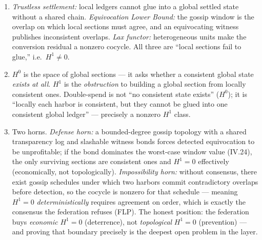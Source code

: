 \begin{enumerate}[label=\textbf{IV.\arabic*},leftmargin=2.8em,itemsep=8pt,topsep=4pt]
\item \wbcheck \emph{Trustless settlement:} local ledgers cannot glue into a global
  settled state without a shared chain. \emph{Equivocation Lower Bound:} the gossip
  window is the overlap on which local sections must agree, and an equivocating
  witness publishes inconsistent overlaps. \emph{Lax functor:} heterogeneous units
  make the conversion residual a nonzero cocycle. All three are ``local sections fail
  to glue,'' i.e.\ $H^1\ne 0$.

\item \wbcheck $H^0$ is the space of global sections --- it asks whether a consistent
  global state \emph{exists at all}. $H^1$ is the \emph{obstruction} to building a
  global section from locally consistent ones. Double-spend is not ``no consistent
  state exists'' ($H^0$); it is ``locally each harbor is consistent, but they cannot
  be glued into one consistent global ledger'' --- precisely a nonzero $H^1$ class.

\item \wbopen\wbstar Two horns. \emph{Defense horn:} a bounded-degree gossip topology
  with a shared transparency log and slashable witness bonds forces detected
  equivocation to be unprofitable; if the bond dominates the worst-case window value
  (IV.24), the only surviving sections are consistent ones and $H^1=0$ effectively
  (economically, not topologically). \emph{Impossibility horn:} without consensus,
  there exist gossip schedules under which two harbors commit contradictory overlaps
  before detection, so the cocycle is nonzero for that schedule --- meaning $H^1=0$
  \emph{deterministically} requires agreement on order, which is exactly the consensus
  the federation refuses (FLP). The honest position: the federation buys
  \emph{economic} $H^1=0$ (deterrence), not \emph{topological} $H^1=0$ (prevention) ---
  and proving that boundary precisely is the deepest open problem in the layer.

\end{enumerate}
